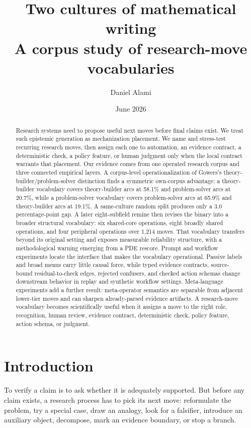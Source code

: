 \documentclass[11pt]{article}
\title{Two cultures of mathematical writing\\
\large A corpus study of research-move vocabularies}
\author{Daniel Alami}
\date{June 2026}
\begin{document}
\maketitle

\begin{abstract}
Research systems need to propose useful next moves before final claims exist.
We treat such epistemic generation as mechanization placement. We name and
stress-test recurring research moves, then assign each one to automation, an
evidence contract, a deterministic check, a policy feature, or human judgment
only when the local contract warrants that placement. Our evidence comes from
one operated research corpus and three connected empirical layers. A
corpus-level operationalization of Gowers's theory-builder/problem-solver
distinction finds a symmetric own-corpus advantage: a theory-builder
vocabulary covers theory-builder arcs at 58.1\% and problem-solver arcs at
20.7\%, while a problem-solver vocabulary covers problem-solver arcs at 65.9\%
and theory-builder arcs at 19.1\%. A same-culture random split produces only a
3.0 percentage-point gap. A later eight-subfield remine then revises the binary
into a broader structural vocabulary: six shared-core operations, eight broadly
shared operations, and four peripheral operations over 1,214 moves. That
vocabulary transfers beyond its original setting and exposes measurable
reliability structure, with a methodological warning emerging from a PDE
rescore. Prompt and workflow experiments locate the interface that makes the
vocabulary operational. Passive labels and broad menus carry little causal
force, while typed evidence contracts, source-bound residual-to-check edges,
rejected confusers, and checked action schemas change downstream behavior in
replay and synthetic workflow settings. Meta-language experiments add a further
result: meta-operator semantics are separable from adjacent lower-tier moves and
can sharpen already-parsed evidence artifacts. A research-move vocabulary
becomes scientifically useful when it assigns a move to the right
role, recognition, human review, evidence contract, deterministic check,
policy feature, action schema, or judgment.
\end{abstract}

\section{Introduction}

To verify a claim is to ask whether it is adequately supported. But before any
claim exists, a research process has to pick its next move: reformulate the
problem, try a special case, draw an analogy, look for a falsifier, introduce an
auxiliary object, decompose, mark an evidence boundary, or stop a branch.
\end{document}

